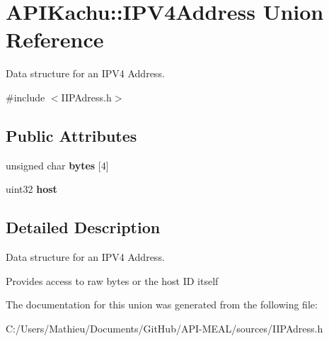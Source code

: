 \hypertarget{union_a_p_i_kachu_1_1_i_p_v4_address}{}\section{A\+P\+I\+Kachu\+:\+:I\+P\+V4\+Address Union Reference}
\label{union_a_p_i_kachu_1_1_i_p_v4_address}


Data structure for an I\+P\+V4 Address.  




{\ttfamily \#include $<$I\+I\+P\+Adress.\+h$>$}

\subsection*{Public Attributes}
\begin{DoxyCompactItemize}
\item 
unsigned char {\bfseries bytes} \mbox{[}4\mbox{]}\hypertarget{union_a_p_i_kachu_1_1_i_p_v4_address_a4360d9dee0f8be41e9ee09ab2c64f3df}{}\label{union_a_p_i_kachu_1_1_i_p_v4_address_a4360d9dee0f8be41e9ee09ab2c64f3df}

\item 
uint32 {\bfseries host}\hypertarget{union_a_p_i_kachu_1_1_i_p_v4_address_a2e09805cb6678faed5ecc8eea147874f}{}\label{union_a_p_i_kachu_1_1_i_p_v4_address_a2e09805cb6678faed5ecc8eea147874f}

\end{DoxyCompactItemize}


\subsection{Detailed Description}
Data structure for an I\+P\+V4 Address. 

Provides access to raw bytes or the host ID itself 

The documentation for this union was generated from the following file\+:\begin{DoxyCompactItemize}
\item 
C\+:/\+Users/\+Mathieu/\+Documents/\+Git\+Hub/\+A\+P\+I-\/\+M\+E\+A\+L/sources/I\+I\+P\+Adress.\+h\end{DoxyCompactItemize}
